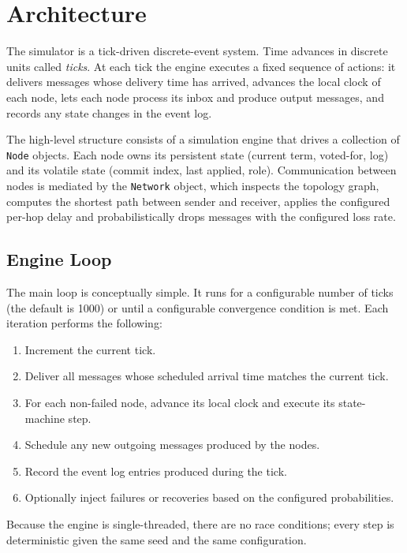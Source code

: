 \section{Architecture}

The simulator is a tick-driven discrete-event system. Time advances in discrete units called \emph{ticks}. At each tick the engine executes a fixed sequence of actions: it delivers messages whose delivery time has arrived, advances the local clock of each node, lets each node process its inbox and produce output messages, and records any state changes in the event log.

The high-level structure consists of a simulation engine that drives a collection of \texttt{Node} objects. Each node owns its persistent state (current term, voted-for, log) and its volatile state (commit index, last applied, role). Communication between nodes is mediated by the \texttt{Network} object, which inspects the topology graph, computes the shortest path between sender and receiver, applies the configured per-hop delay and probabilistically drops messages with the configured loss rate.

\subsection{Engine Loop}

The main loop is conceptually simple. It runs for a configurable number of ticks (the default is 1000) or until a configurable convergence condition is met. Each iteration performs the following:

\begin{enumerate}
    \item Increment the current tick.
    \item Deliver all messages whose scheduled arrival time matches the current tick.
    \item For each non-failed node, advance its local clock and execute its state-machine step.
    \item Schedule any new outgoing messages produced by the nodes.
    \item Record the event log entries produced during the tick.
    \item Optionally inject failures or recoveries based on the configured probabilities.
\end{enumerate}

Because the engine is single-threaded, there are no race conditions; every step is deterministic given the same seed and the same configuration.

